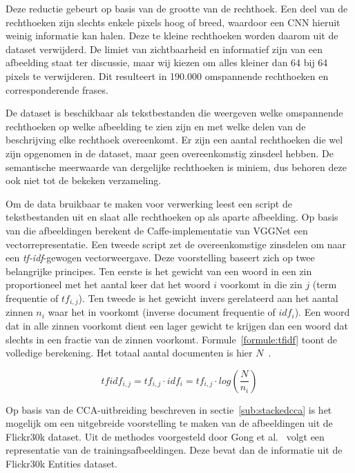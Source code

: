 Deze reductie gebeurt op basis van de grootte van de rechthoek. Een deel van de rechthoeken zijn slechts enkele pixels hoog of breed, waardoor een CNN hieruit weinig informatie kan halen. Deze te kleine rechthoeken worden daarom uit de dataset verwijderd. De limiet van zichtbaarheid en informatief zijn van een afbeelding staat ter discussie, maar wij kiezen om alles kleiner dan 64 bij 64 pixels te verwijderen. Dit resulteert in 190.000 omspannende rechthoeken en corresponderende frases. 

De dataset is beschikbaar als tekstbestanden die weergeven welke omspannende rechthoeken op welke afbeelding te zien zijn en met welke delen van de beschrijving elke rechthoek overeenkomt. Er zijn een aantal rechthoeken die wel zijn opgenomen in de dataset, maar geen overeenkomstig zinsdeel hebben. De semantische meerwaarde van dergelijke rechthoeken is miniem, dus behoren deze ook niet tot de bekeken verzameling. 

Om de data bruikbaar te maken voor verwerking leest een script de tekstbestanden uit en slaat alle rechthoeken op als aparte afbeelding. Op basis van die afbeeldingen berekent de Caffe-implementatie van VGGNet een vectorrepresentatie. Een tweede script zet de overeenkomstige zinsdelen om naar een \emph{tf-idf}-gewogen vectorweergave. Deze voorstelling baseert zich op twee belangrijke principes. Ten eerste is het gewicht van een woord in een zin proportioneel met het aantal keer dat het woord $i$ voorkomt in die zin $j$ (term frequentie of $tf_{i,j}$). Ten tweede is het gewicht invers gerelateerd aan het aantal zinnen $n_i$ waar het in voorkomt (inverse document frequentie of $idf_i$). Een woord dat in alle zinnen voorkomt dient een lager gewicht te krijgen dan een woord dat slechts in een fractie van de zinnen voorkomt. Formule~\eqref{formule:tfidf} toont de volledige berekening. Het totaal aantal documenten is hier $N$~\cite{Jurafsky:2009:SLP:1214993}. 

\begin{equation}
\label{formule:tfidf}
	tfidf_{i,j} = tf_{i,j}\cdot{idf_{i}} = tf_{i,j}\cdot{log(\frac{N}{n_i})}
\end{equation}

Op basis van de CCA-uitbreiding beschreven in sectie~\ref{sub:stackedcca} is het mogelijk om een uitgebreide voorstelling te maken van de afbeeldingen uit de Flickr30k dataset. Uit de methodes voorgesteld door Gong et al.~\cite{Gong2014} volgt een representatie van de trainingsafbeeldingen. Deze bevat dan de informatie uit de Flickr30k Entities dataset.

